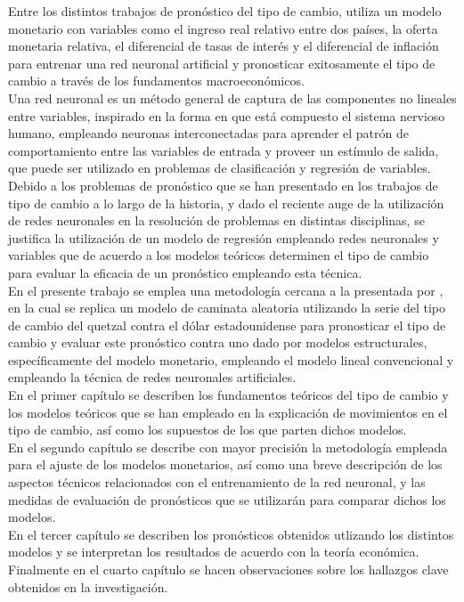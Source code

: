 Entre los distintos trabajos de pronóstico del tipo de cambio, \textcite{sunythesis} utiliza un modelo monetario con variables como el ingreso real relativo entre dos países, la oferta monetaria relativa, el diferencial de tasas de interés y el diferencial de inflación para entrenar una red neuronal artificial y pronosticar exitosamente el tipo de cambio a través de los fundamentos macroeconómicos.\\

Una red neuronal es un método general de captura de las componentes no lineales entre variables, inspirado en la forma en que está compuesto el sistema nervioso humano, empleando neuronas interconectadas para aprender el patrón de comportamiento entre las variables de entrada y proveer un estímulo de salida, que puede ser utilizado en problemas de clasificación y regresión de variables.\\

Debido a los problemas de pronóstico que se han presentado en los trabajos de tipo de cambio a lo largo de la historia, y dado el reciente auge de la utilización de redes neuronales en la resolución de problemas en distintas disciplinas, se justifica la utilización de un modelo de regresión empleando redes neuronales y variables que de acuerdo a los modelos teóricos determinen el tipo de cambio para evaluar la eficacia de un pronóstico empleando esta técnica.\\

En el presente trabajo se emplea una metodología cercana a la presentada por \textcite{sunythesis}, en la cual se replica un modelo de caminata aleatoria utilizando la serie del tipo de cambio del quetzal contra el dólar estadounidense para pronosticar el tipo de cambio y evaluar este pronóstico contra uno dado por modelos estructurales, específicamente del modelo monetario, empleando el modelo lineal convencional y empleando la técnica de redes neuronales artificiales.\\

En el primer capítulo se describen los fundamentos teóricos del tipo de cambio y los modelos teóricos que se han empleado en la explicación de movimientos en el tipo de cambio, así como los supuestos de los que parten dichos modelos.\\

En el segundo capítulo se describe con mayor precisión la metodología empleada para el ajuste de los modelos monetarios, así como una breve descripción de los aspectos técnicos relacionados con el entrenamiento de la red neuronal, y las medidas de evaluación de pronósticos que se utilizarán para comparar dichos los modelos.\\

En el tercer capítulo se describen los pronósticos obtenidos utlizando los distintos modelos y se interpretan los resultados de acuerdo con la teoría económica.\\

Finalmente en el cuarto capítulo se hacen observaciones sobre los hallazgos clave obtenidos en la investigación.